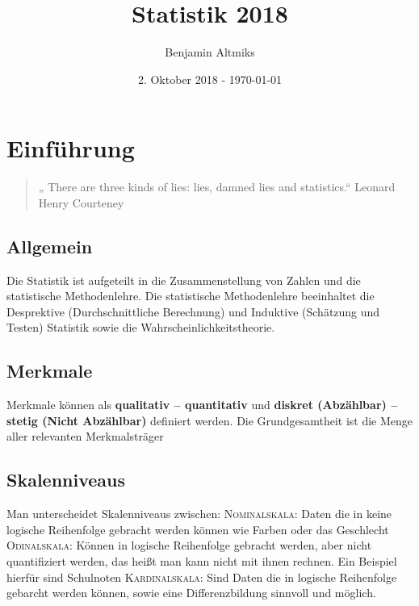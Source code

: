 \documentclass[a4paper,10pt]{scrartcl}
\title{Statistik 2018}
\author{Benjamin Altmiks}
\date{2. Oktober 2018 - \today}
\begin{document}
\maketitle
\tableofcontents
\newpage
\section{Einführung}
\begin{quote}
    „ There are three kinds of lies: lies, damned lies and statistics.“ \newline Leonard Henry Courteney
\end{quote}
\subsection{Allgemein}
Die Statistik ist aufgeteilt in die Zusammenstellung von Zahlen und die statistische Methodenlehre. Die statistische Methodenlehre beeinhaltet die Desprektive (Durchschnittliche Berechnung) und Induktive (Schätzung und Testen) Statistik sowie die Wahrscheinlichkeitstheorie.

\subsection{Merkmale}
Merkmale können als \textbf{qualitativ – quantitativ} und \newline \textbf{diskret (Abzählbar) – stetig (Nicht Abzählbar)} definiert werden. \newline
Die Grundgesamtheit ist die Menge aller relevanten Merkmalsträger

\subsection{Skalenniveaus}
Man unterscheidet Skalenniveaus zwischen: \newline\newline
\textsc{Nominalskala}: Daten die in keine logische Reihenfolge gebracht werden können wie Farben oder das Geschlecht
\newline\newline\textsc{Odinalskala}: Können in logische Reihenfolge gebracht werden, aber nicht quantifiziert werden, das heißt man kann nicht mit ihnen rechnen. Ein Beispiel hierfür sind Schulnoten
\newline\newline\textsc{Kardinalskala}: Sind Daten die in logische Reihenfolge gebarcht werden können, sowie eine Differenzbildung sinnvoll und möglich.
\end{document}
